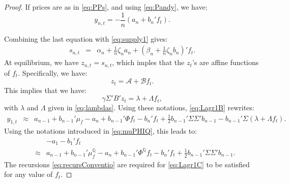 \documentclass[
  12pt,
]{book}
\theoremstyle{definition}
\theoremstyle{definition}
\theoremstyle{definition}
\theoremstyle{definition}
\theoremstyle{remark}
\begin{document}
\begin{proof}
If prices are as in \eqref{eq:PPs}, and using \eqref{eq:Pandy}, we have:
\[
y_{n,t} = -\frac{1}{n}(a_n + b_n'f_t).
\]

Combining the last equation with \eqref{eq:supply1} gives:
\begin{eqnarray}
s_{n,t} &=& \alpha_n  + \frac{1}{n}\zeta_n a_n + \left(\beta_n + \frac{1}{n}\zeta_n b_n\right)'f_t.
\end{eqnarray}
At equilibrium, we have \(z_{n,t}=s_{n,t}\), which imples that the \(z_t\)'s are affine functions of \(f_t\). Specifically, we have:
\[
z_t = \mathcal{A} + \mathcal{B}f_t.
\]
This implies that we have:
\[
\gamma \Sigma' B'z_t  = \lambda + \Lambda f_t,
\]
with \(\lambda\) and \(\Lambda\) given in \eqref{eq:lambdas}. Using these notations, \eqref{eq:Lagr1B} rewrites:
\begin{eqnarray*}
y_{1,t} &\approx& a_{n-1} + b_{n-1}'\mu_f  - a_{n} + b_{n-1}'\Phi f_t - b_{n}'f_{t} + \frac{1}{2}b_{n-1}'\Sigma \Sigma'b_{n-1} - b_{n-1}'\Sigma (\lambda + \Lambda f_t).
\end{eqnarray*}
Using the notations introduced in \eqref{eq:muPHIQ}, this leads to:
\begin{eqnarray}
&&- a_1 - b_1' f_t \nonumber\\
&\approx& a_{n-1} + b_{n-1}'\mu_f^{\mathbb{Q}}  - a_{n} + b_{n-1}'\Phi^{\mathbb{Q}} f_t - b_{n}'f_{t} + \frac{1}{2}b_{n-1}'\Sigma \Sigma'b_{n-1}. \label{eq:Lagr1C}
\end{eqnarray}
The recursions \eqref{eq:recursConventio} are required for \eqref{eq:Lagr1C} to be satisfied for any value of \(f_t\).
\end{proof}
\end{document}

